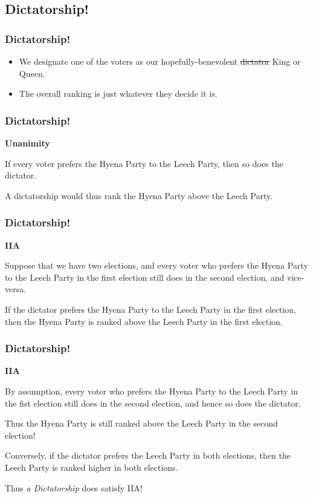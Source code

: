 \documentclass{beamer}
\newcommand{\heading}[1]{{\Large\bfseries #1}\vspace{1em}}
\begin{document}
    \subsection{Dictatorship!}
    \begin{frame}
        \frametitle{Dictatorship!}
    
        \begin{itemize}
            \item We designate one of the voters as our hopefully-benevolent \st{dictator} King or Queen. \pause
            \item The overall ranking is just whatever they decide it is.
        \end{itemize}
    
    \end{frame}
    \begin{frame}
        \frametitle{Dictatorship!}
        \heading{Unanimity}
    
        If every voter prefers the Hyena Party to the Leech Party, then so does the dictator. \pause

        A dictatorship would thus rank the Hyena Party above the Leech Party.

    \end{frame}
    \begin{frame}
        \frametitle{Dictatorship!}
        \heading{IIA}        
    
        Suppose that we have two elections, and every voter who prefers the Hyena Party to the Leech Party in the first election still does in the second election, and vice-versa. \pause

        If the dictator prefers the Hyena Party to the Leech Party in the first election, then the Hyena Party is ranked above the Leech Party in the first election. \pause

    \end{frame}
    \begin{frame}
        \frametitle{Dictatorship!}
        \heading{IIA}
    
        By assumption, every voter who prefers the Hyena Party to the Leech Party in the fist election still does in the second election, and hence so does the dictator. \pause

        Thus the Hyena Party is still ranked above the Leech Party in the second election! \pause

        Conversely, if the dictator prefers the Leech Party in both elections, then the Leech Party is ranked higher in both elections. \pause

        Thus \emph{a Dictatorship} \alert{does satisfy} IIA!
    
    \end{frame}
\end{document}
